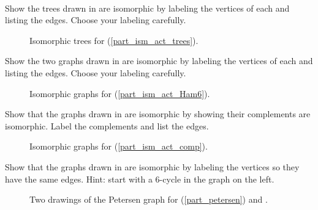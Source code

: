 \begin{act}
\label{act_show_isomorphic}
~
    \begin{actpart}
        \item \label{part_ism_act_trees} Show the trees drawn in  are isomorphic by labeling the vertices of each and listing the edges. Choose your labeling carefully.
            \begin{figure}[hbtp]
                \centering
                
                \caption{Isomorphic trees for  (\ref{part_ism_act_trees}).}
                \label{fig_ism_trees}
            \end{figure}        
        \item \label{part_ism_act_Ham6} Show the two graphs drawn in  are isomorphic by labeling the vertices of each and listing the edges. Choose your labeling carefully.
            \begin{figure}[hbtp]
                \centering
                
                \caption{Isomorphic graphs for  (\ref{part_ism_act_Ham6}).}
                \label{fig_ism_notK33}
            \end{figure}
        \item \label{part_ism_act_comp} Show that the graphs drawn in  are isomorphic by showing their complements are isomorphic.  Label the complements and list the edges.
            \begin{figure}[hbtp]
                \centering
                
                \caption{Isomorphic graphs for  (\ref{part_ism_act_comp}).}
                \label{fig_act_ism_comp}
            \end{figure}
        \item \label{part_petersen} Show that the graphs drawn in  are isomorphic by labeling the vertices so they have the same edges.  Hint: start with a 6-cycle in the graph on the left.
            \begin{figure}[hbtp]
                \centering
                
                \caption{Two drawings of the Petersen graph for  (\ref{part_petersen}) and .}
                \label{fig_ism_petersen}
            \end{figure}
    \end{actpart}
\end{act}

